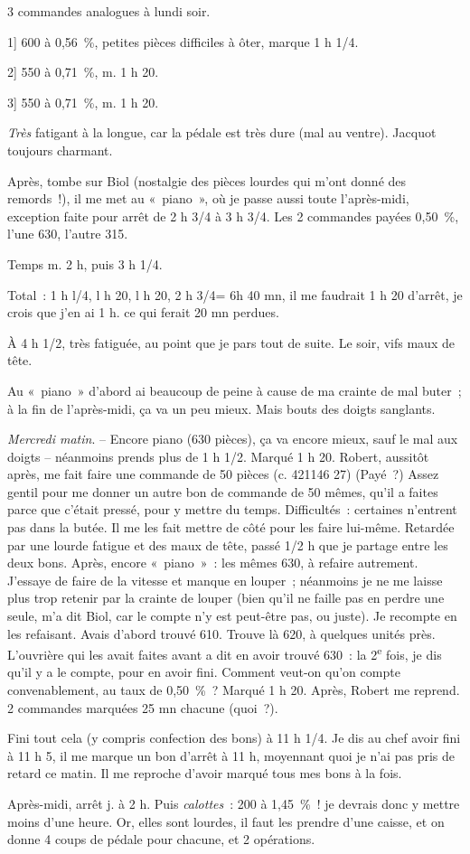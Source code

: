 \documentclass[french,twoside]{book} %
\begin{document}
 3 commandes analogues à lundi soir.\par
1] 600 à 0,56 \%, petites pièces difficiles à ôter, marque 1 h 1/4.\par
2] 550 à 0,71 \%, m. 1 h 20.\par
3] 550 à 0,71 \%, m. 1 h 20.\par
{\itshape Très} fatigant à la longue, car la pédale est très dure (mal au ventre). Jacquot toujours charmant.\par
Après, tombe sur Biol (nostalgie des pièces lourdes qui m'ont donné des remords !), il me met au « piano », où je passe aussi toute l'après-midi, exception faite pour arrêt de 2 h 3/4 à 3 h 3/4. Les 2 commandes payées 0,50 \%, l'une 630, l'autre 315.\par
Temps m. 2 h, puis 3 h 1/4.\par
Total : 1 h l/4, l h 20, l h 20, 2 h 3/4= 6h 40 mn, il me faudrait 1 h 20 d'arrêt, je crois que j'en ai 1 h. ce qui ferait 20 mn perdues.\par
À 4 h 1/2, très fatiguée, au point que je pars tout de suite. Le soir, vifs maux de tête.\par
Au « piano » d'abord ai beaucoup de peine à cause de ma crainte de mal buter ; à la fin de l'après-midi, ça va un peu mieux. Mais bouts des doigts sanglants.\par
{\itshape Mercredi matin}. – Encore piano (630 pièces), ça va encore mieux, sauf le mal aux doigts – néanmoins prends plus de 1 h 1/2. Marqué 1 h 20. Robert, aussitôt après, me fait faire une commande de 50 pièces (c. 421146 27) (Payé ?) Assez gentil pour me donner un autre bon de commande de 50 mêmes, qu'il a faites parce que c'était pressé, pour y mettre du temps. Difficultés : certaines n'entrent pas dans la butée. Il me les fait mettre de côté pour les faire lui-même. Retardée par une lourde fatigue et des maux de tête, passé 1/2 h que je partage entre les deux bons. Après, encore « piano » : les mêmes 630, à refaire autrement. J'essaye de faire de la vitesse et manque en louper ; néanmoins je ne me laisse plus trop retenir par la crainte de louper (bien qu'il ne faille pas en perdre une seule, m'a dit Biol, car le compte n'y est peut-être pas, ou juste). Je recompte en les refaisant. Avais d'abord trouvé 610. Trouve là 620, à quelques unités près. L'ouvrière qui les avait faites avant a dit en avoir trouvé 630 : la 2\textsuperscript{e} fois, je dis qu'il y a le compte, pour en avoir fini. Comment veut-on qu'on compte convenablement, au taux de 0,50 \% ? Marqué 1 h 20. Après, Robert me reprend. 2 commandes marquées 25 mn chacune (quoi ?).\par
Fini tout cela (y compris confection des bons) à 11 h 1/4. Je dis au chef avoir fini à 11 h 5, il me marque un bon d'arrêt à 11 h, moyennant quoi je n'ai pas pris de retard ce matin. Il me reproche d'avoir marqué tous mes bons à la fois.\par
Après-midi, arrêt j. à 2 h. Puis {\itshape calottes} : 200 à 1,45 \% ! je devrais donc y mettre moins d'une heure. Or, elles sont lourdes, il faut les prendre d'une caisse, et on donne 4 coups de pédale pour chacune, et 2 opérations.\par
\end{document}
